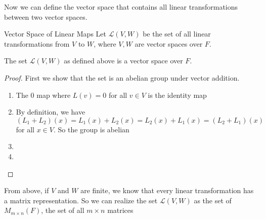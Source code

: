 \documentclass[main.tex]{subfiles}
\begin{document}
    Now we can define the vector space that contains all linear transformations between two vector spaces. 
    \begin{defn}{Vector Space of Linear Maps}{}{}
        Let $\mathcal{L}(V,W)$ be the set of all linear transformations from $V$ to $W$, where $V,W$ are vector spaces over $F$.
    \end{defn}
    \begin{prop}{}{}
        The set $\mathcal{L}(V,W)$ as defined above is a vector space over $F$.
    \end{prop}
    \begin{proof}
        First we show that the set is an abelian group under vector addition. 
        \begin{enumerate}
            \item The 0 map where $L(v) = 0$ for all $v\in V$ is the identity map
            \item By definition, we have $(L_1 + L_2)(x) = L_1(x) + L_2(x) = L_2(x) + L_1(x) = (L_2 + L_1)(x)$ for all $x\in V$. So the group is abelian 
            \item 
            \item 
        \end{enumerate}
    \end{proof}

    From above, if $V$ and $W$ are finite, we know that every linear transformation has a matrix representation. So we can realize the set $\mathcal{L}(V,W)$ as the set of $M_{m\times n}(F)$, the set of all $m\times n$ matrices 
\end{document}
